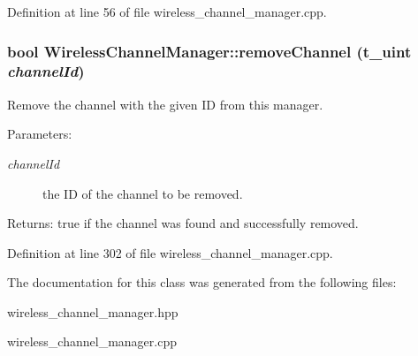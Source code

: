 Definition at line 56 of file wireless\_\-channel\_\-manager.cpp.
\subsubsection{\setlength{\rightskip}{0pt plus 5cm}bool Wireless\-Channel\-Manager::remove\-Channel (\bf{t\_\-uint} {\em channel\-Id})}\label{classWirelessChannelManager_8a0d90f1053c2de6bf5c1bf1358bd889}


Remove the channel with the given ID from this manager. 

\begin{Desc}
\item[Parameters:]
\begin{description}
\item[{\em channel\-Id}]the ID of the channel to be removed. \end{description}
\end{Desc}
\begin{Desc}
\item[Returns:]true if the channel was found and successfully removed. \end{Desc}


Definition at line 302 of file wireless\_\-channel\_\-manager.cpp.

The documentation for this class was generated from the following files:\begin{CompactItemize}
\item 
wireless\_\-channel\_\-manager.hpp\item 
wireless\_\-channel\_\-manager.cpp\end{CompactItemize}
